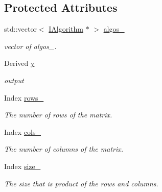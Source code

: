 \subsection*{Protected Attributes}
\begin{DoxyCompactItemize}
\item 
std\+::vector$<$ \hyperlink{classow__core_1_1IScalarAlgorithm}{I\+Algorithm} $\ast$ $>$ \hyperlink{classow__core_1_1MatrixAlgorithm_aef6a1e5c1d3e4276f147094059a948e5}{algos\+\_\+}\hypertarget{classow__core_1_1MatrixAlgorithm_aef6a1e5c1d3e4276f147094059a948e5}{}\label{classow__core_1_1MatrixAlgorithm_aef6a1e5c1d3e4276f147094059a948e5}

\begin{DoxyCompactList}\small\item\em vector of algos\+\_\+. \end{DoxyCompactList}\item 
Derived \hyperlink{classow__core_1_1MatrixAlgorithm_aaef028a042065239ac6737fb9f88f185}{y}\hypertarget{classow__core_1_1MatrixAlgorithm_aaef028a042065239ac6737fb9f88f185}{}\label{classow__core_1_1MatrixAlgorithm_aaef028a042065239ac6737fb9f88f185}

\begin{DoxyCompactList}\small\item\em output \end{DoxyCompactList}\item 
Index \hyperlink{classow__core_1_1MatrixAlgorithm_afe5d6ee8bc73ea3ff1c8c2f118f63bd8}{rows\+\_\+}\hypertarget{classow__core_1_1MatrixAlgorithm_afe5d6ee8bc73ea3ff1c8c2f118f63bd8}{}\label{classow__core_1_1MatrixAlgorithm_afe5d6ee8bc73ea3ff1c8c2f118f63bd8}

\begin{DoxyCompactList}\small\item\em The number of rows of the matrix. \end{DoxyCompactList}\item 
Index \hyperlink{classow__core_1_1MatrixAlgorithm_a2278765111a854825f89392a1ed63137}{cols\+\_\+}\hypertarget{classow__core_1_1MatrixAlgorithm_a2278765111a854825f89392a1ed63137}{}\label{classow__core_1_1MatrixAlgorithm_a2278765111a854825f89392a1ed63137}

\begin{DoxyCompactList}\small\item\em The number of columns of the matrix. \end{DoxyCompactList}\item 
Index \hyperlink{classow__core_1_1MatrixAlgorithm_aa31b11b6bb7d1bbf566a004b30eae410}{size\+\_\+}\hypertarget{classow__core_1_1MatrixAlgorithm_aa31b11b6bb7d1bbf566a004b30eae410}{}\label{classow__core_1_1MatrixAlgorithm_aa31b11b6bb7d1bbf566a004b30eae410}

\begin{DoxyCompactList}\small\item\em The size that is product of the rows and columns. \end{DoxyCompactList}\end{DoxyCompactItemize}


